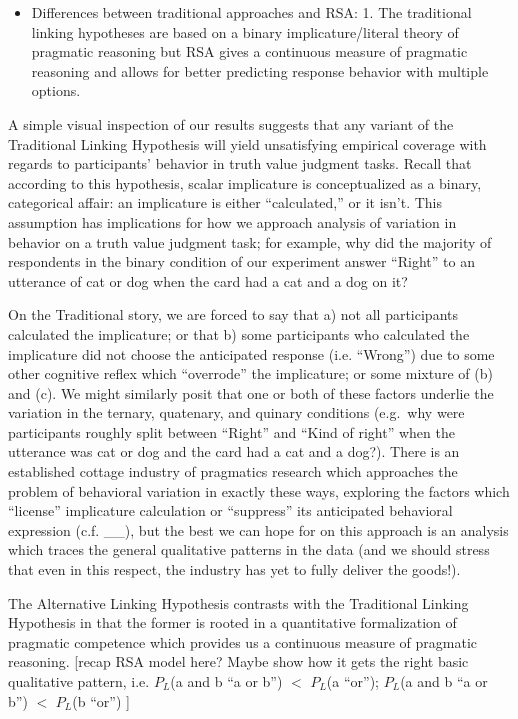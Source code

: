 \documentclass[floatsintext,man]{apa6}
\providecommand{\tightlist}{%
  \setlength{\itemsep}{0pt}\setlength{\parskip}{0pt}}
\theoremstyle{definition}
\theoremstyle{definition}
\theoremstyle{definition}
\theoremstyle{remark}
\begin{document}
\begin{itemize}
\tightlist
\item
  Differences between traditional approaches and RSA: 1. The traditional
  linking hypotheses are based on a binary implicature/literal theory of
  pragmatic reasoning but RSA gives a continuous measure of pragmatic
  reasoning and allows for better predicting response behavior with
  multiple options.
\end{itemize}

A simple visual inspection of our results suggests that any variant of
the Traditional Linking Hypothesis will yield unsatisfying empirical
coverage with regards to participants' behavior in truth value judgment
tasks. Recall that according to this hypothesis, scalar implicature is
conceptualized as a binary, categorical affair: an implicature is either
\enquote{calculated,} or it isn't. This assumption has implications for
how we approach analysis of variation in behavior on a truth value
judgment task; for example, why did the majority of respondents in the
binary condition of our experiment answer \enquote{Right} to an
utterance of cat or dog when the card had a cat and a dog on it?

On the Traditional story, we are forced to say that a) not all
participants calculated the implicature; or that b) some participants
who calculated the implicature did not choose the anticipated response
(i.e. \enquote{Wrong}) due to some other cognitive reflex which
\enquote{overrode} the implicature; or some mixture of (b) and (c). We
might similarly posit that one or both of these factors underlie the
variation in the ternary, quatenary, and quinary conditions (e.g.~why
were participants roughly split between \enquote{Right} and
\enquote{Kind of right} when the utterance was cat or dog and the card
had a cat and a dog?). There is an established cottage industry of
pragmatics research which approaches the problem of behavioral variation
in exactly these ways, exploring the factors which \enquote{license}
implicature calculation or \enquote{suppress} its anticipated behavioral
expression (c.f. \_\_), but the best we can hope for on this approach is
an analysis which traces the general qualitative patterns in the data
(and we should stress that even in this respect, the industry has yet to
fully deliver the goods!).

The Alternative Linking Hypothesis contrasts with the Traditional
Linking Hypothesis in that the former is rooted in a quantitative
formalization of pragmatic competence which provides us a continuous
measure of pragmatic reasoning. {[}recap RSA model here? Maybe show how
it gets the right basic qualitative pattern, i.e. \(P_L\)(a and
b\textbar{} \enquote{a or b}) \(<\) \(P_L\)(a \textbar{} \enquote{or});
\(P_L\)(a and b\textbar{} \enquote{a or b}) \(<\) \(P_L\)(b \textbar{}
\enquote{or}) {]}
\end{document}
